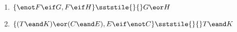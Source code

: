 \begin{enumerate}[label=(\arabic*)]
\item $\{\enot F\eif G, F\eif H\} \sststile{}{} G\eor H$

%

\item	$\{(T \eand K) \eor (C \eand E), E \eif \enot C\} \sststile{}{}  T \eand K$



%



\end{enumerate}

